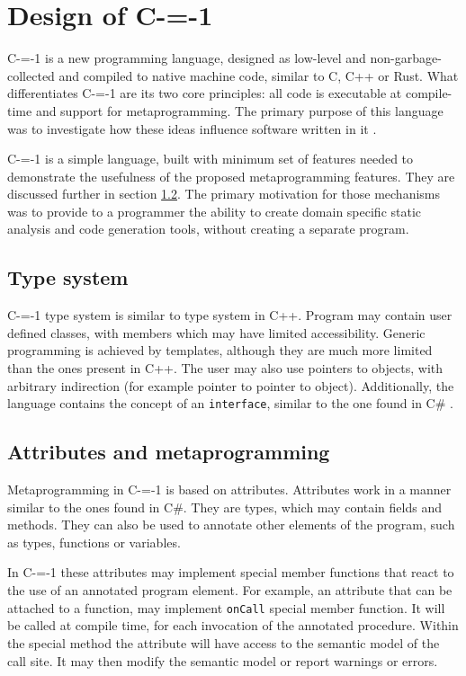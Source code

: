 \section{Design of C-=-1}
\label{language-design}
C-=-1 is a new programming language, designed as low-level and non-garbage-collected and compiled to native machine code, similar to C, C++ or Rust.
What differentiates C-=-1 are its two core principles: all code is executable at compile-time and support for metaprogramming.
The primary purpose of this language was to investigate how these ideas influence software written in it \cite{grabski2022compilation}.

C-=-1 is a simple language, built with minimum set of features needed to demonstrate the usefulness of the proposed metaprogramming features.
They are discussed further in section  \ref{design:attributes_and_metaprogramming}.
The primary motivation for those mechanisms was to provide to a programmer the ability to create domain specific static analysis and code generation tools, without creating a separate program.

\subsection{Type system}

C-=-1 type system is similar to type system in C++.
Program may contain user defined classes, with members which may have limited accessibility. Generic programming is achieved by  templates, although they are much more limited than the ones present in C++.
The user may also use pointers to objects, with arbitrary indirection (for example pointer to pointer to object).
Additionally, the language contains the concept of an \lstinline{interface}, similar to the one found in C\#  \cite{hejlsberg2003c}.

\subsection{Attributes and metaprogramming}
\label{design:attributes_and_metaprogramming}

Metaprogramming in C-=-1 is based on attributes. Attributes work in a manner similar to the ones found in C\#.
They are types, which may contain fields and methods.
They can also be used to annotate other elements of the program, such as types, functions or variables.

In C-=-1 these attributes may implement special member functions that react to the use of an annotated program element.
For example, an attribute that can be attached to a function, may implement \lstinline{onCall} special member function.
It will be called at compile time, for each invocation of the annotated procedure.
Within the special method the attribute will have access to the semantic model of the call site.
It may then modify the semantic model or report warnings or errors.

